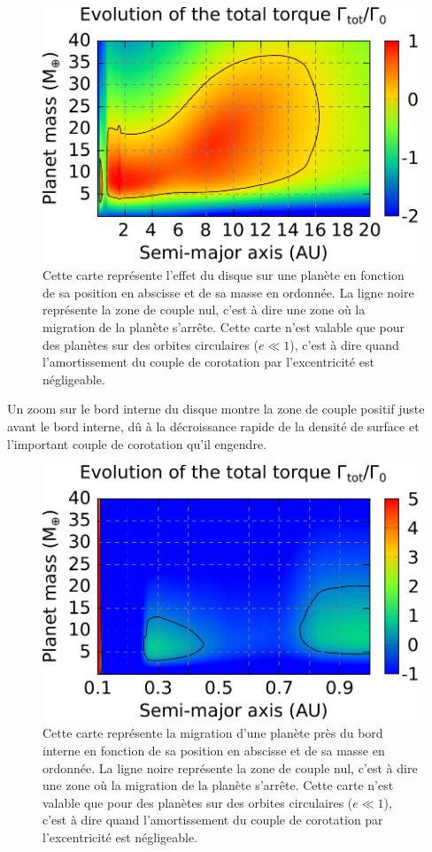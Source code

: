 \begin{figure}[htb]
\centering
\includegraphics[width=0.65\linewidth]{figure/HSE/HSE_migration_map.pdf}
\caption{Cette carte représente l'effet du disque sur une planète en fonction de sa position en abscisse et de sa masse en ordonnée. La ligne noire représente la zone de couple nul, c'est à dire une zone où la migration de la planète s'arrête. Cette carte n'est valable que pour des planètes sur des orbites circulaires ($e\ll1$), c'est à dire quand l'amortissement du couple de corotation par l'excentricité est négligeable.}\label{fig:migration_map_HSE}
\end{figure}

Un zoom sur le bord interne du disque  montre la zone de couple positif juste avant le bord interne, dû à la décroissance rapide de la densité de surface et l'important couple de corotation qu'il engendre.

\begin{figure}[htb]
\centering
\includegraphics[width=0.65\linewidth]{figure/HSE/HSE_zoom-in.pdf}
\caption{Cette carte représente la migration d'une planète près du bord interne en fonction de sa position en abscisse et de sa masse en ordonnée. La ligne noire représente la zone de couple nul, c'est à dire une zone où la migration de la planète s'arrête. Cette carte n'est valable que pour des planètes sur des orbites circulaires ($e\ll1$), c'est à dire quand l'amortissement du couple de corotation par l'excentricité est négligeable.}\label{fig:HSE_mig_zoom-in}
\end{figure}

